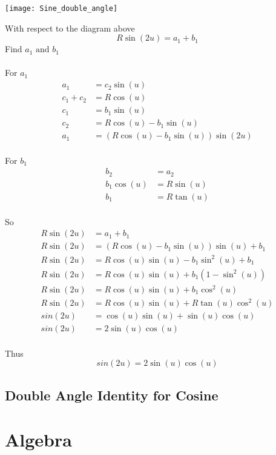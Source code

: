 \documentclass[11pt]{book}
\begin{document}
\begin{center}
\texttt{[image: Sine\_double\_angle]}
\end{center}

With respect to the diagram above
\[R\sin{(2u)} = a_1 + b_1\]
Find \(a_1 \text{ and } b_1\)\\
\\
For \(a_1\) \\
\begin{align*}
a_1 &= c_2\sin{(u)} \\
c_1 + c_2 &= R\cos{(u)} \\
c_1 &= b_1\sin{(u)} \\
c_2 &=  R\cos{(u)} - b_1\sin{(u)} \\ 
a_1 &= (R\cos{(u)} - b_1\sin{(u)})\sin{(2u)}
\end{align*}
\\
For \(b_1\) \\
\begin{align*}
b_2 &= a_2 \\
b_1\cos{(u)} &= R\sin{(u)} \\
b_1 &= R\tan{(u)}
\end{align*}
\\
So
\begin{align*}
R\sin{(2u)} &= a_1 + b_1 \\
R\sin{(2u)} &= (R\cos{(u)} - b_1\sin{(u)})\sin{(u)} + b_1 \\
R\sin{(2u)} &= R\cos{(u)}\sin{(u)} -b_1\sin^2{(u)} +b_1 \\
R\sin{(2u)} &= R\cos{(u)}\sin{(u)} + b_1(1 -\sin^2{(u)})\\
R\sin{(2u)} &= R\cos{(u)}\sin{(u)} + b_1\cos^2{(u)} \\
R\sin{(2u)} &= R\cos{(u)}\sin{(u)} + R\tan{(u)}\cos^2{(u)} \\
sin{(2u)} &= \cos{(u)}\sin{(u)} + \sin{(u)}\cos{(u)} \\
sin{(2u)} &= 2\sin{(u)}\cos{(u)} 
\end{align*}
\\
Thus
\[sin{(2u)} = 2\sin{(u)}\cos{(u)} \]

\section{Double Angle Identity for Cosine}

\chapter{Algebra}
\end{document}
